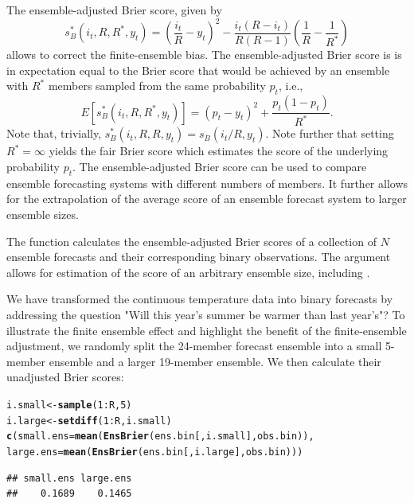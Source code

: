 \documentclass[article]{jss}\usepackage{graphicx, color}
\makeatletter
\newcommand{\hlfunctioncall}[1]{\textcolor[rgb]{0,0.501960784313725,0.752941176470588}{\textbf{#1}}}%
\newenvironment{kframe}{%
 \def\at@end@of@kframe{}%
 \ifinner\ifhmode%
  \def\at@end@of@kframe{\end{minipage}}%
  \begin{minipage}{\columnwidth}%
 \fi\fi%
 \def\FrameCommand##1{\hskip\@totalleftmargin \hskip-\fboxsep
 \colorbox{shadecolor}{##1}\hskip-\fboxsep
     \hskip-\linewidth \hskip-\@totalleftmargin \hskip\columnwidth}%
 \MakeFramed {\advance\hsize-\width
   \@totalleftmargin\z@ \linewidth\hsize
   \@setminipage}}%
 {\par\unskip\endMakeFramed%
 \at@end@of@kframe}
\newenvironment{knitrout}{}{} %
\makeatother
\begin{document}
The ensemble-adjusted Brier score, given by \citep{ferro2008effect}
%
\begin{equation}
s_{B}^*(i_t, R, R^*, y_t) = \left(\frac{i_t}{R} - y_t\right)^2 - \frac{i_t(R-i_t)}{R(R-1)}\left(\frac{1}{R} - \frac{1}{R^*}\right)
\label{eq:ens-brier}
\end{equation}
%
allows to correct the finite-ensemble bias.
The ensemble-adjusted Brier score is is in expectation equal to the Brier score that would be achieved by an ensemble with $R^*$ members sampled from the same probability $p_t$, i.e., 
%
\begin{equation}
E\left[s_{B}^*(i_t, R, R^*, y_t)\right] = (p_t - y_t)^2 + \frac{p_t(1-p_t)}{R^*}.
\end{equation}
%
Note that, trivially, $s_{B}^*(i_t, R, R, y_t) = s_{B}(i_t/R, y_t)$.
Note further that setting $R^*=\infty$ yields the fair Brier score \citep{ferro2013fair} which estimates the score of the underlying probability $p_t$.
The ensemble-adjusted Brier score can be used to compare ensemble forecasting systems with different numbers of members.
It further allows for the extrapolation of the average score of an ensemble forecast system to larger ensemble sizes.


The  function  calculates the ensemble-adjusted Brier scores of a collection of $N$ ensemble forecasts and their corresponding binary observations. 
The argument  allows for estimation of the score of an arbitrary ensemble size, including .


We have transformed the continuous temperature data into binary forecasts by addressing the question "Will this year's summer be warmer than last year's"?
To illustrate the finite ensemble effect and highlight the benefit of the finite-ensemble adjustment, we randomly split the 24-member forecast ensemble into a small 5-member ensemble and a larger 19-member ensemble.
We then calculate their unadjusted Brier scores:

\begin{knitrout}
\color{fgcolor}\begin{kframe}
\begin{alltt}
i.small <- \hlfunctioncall{sample}(1:R, 5)
i.large <- \hlfunctioncall{setdiff}(1:R, i.small)
\hlfunctioncall{c}(small.ens=\hlfunctioncall{mean}(\hlfunctioncall{EnsBrier}(ens.bin[, i.small], obs.bin)), 
  large.ens=\hlfunctioncall{mean}(\hlfunctioncall{EnsBrier}(ens.bin[, i.large], obs.bin)))
\end{alltt}
\begin{verbatim}
## small.ens large.ens 
##    0.1689    0.1465
\end{verbatim}
\end{kframe}
\end{knitrout}
\end{document}
